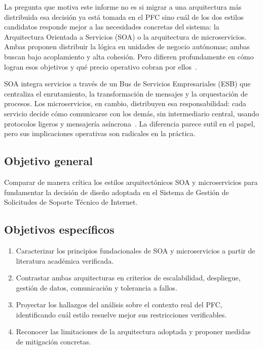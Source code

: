 \documentclass[12pt, a4paper]{article}
\begin{document}
La pregunta que motiva este informe no es si migrar a una arquitectura más
distribuida esa decisión ya está tomada en el PFC sino cuál de los dos
estilos candidatos responde mejor a las necesidades concretas del sistema: la
Arquitectura Orientada a Servicios (SOA) o la arquitectura de microservicios.
Ambas proponen distribuir la lógica en unidades de negocio autónomas; ambas buscan
bajo acoplamiento y alta cohesión. Pero difieren profundamente en cómo logran esos
objetivos y qué precio operativo cobran por ellos~\cite{shadija2017}.

SOA integra servicios a través de un Bus de Servicios Empresariales (ESB) que
centraliza el enrutamiento, la transformación de mensajes y la orquestación de
procesos. Los microservicios, en cambio, distribuyen esa responsabilidad: cada
servicio decide cómo comunicarse con los demás, sin intermediario central, usando
protocolos ligeros y mensajería asíncrona~\cite{liu2020}. La diferencia parece
sutil en el papel, pero sus implicaciones operativas son radicales en la práctica.

\subsection{Objetivo general}

Comparar de manera crítica los estilos arquitectónicos SOA y microservicios para
fundamentar la decisión de diseño adoptada en el Sistema de Gestión de Solicitudes
de Soporte Técnico de Internet.

\subsection{Objetivos específicos}

\begin{enumerate}
  \item Caracterizar los principios fundacionales de SOA y microservicios a partir
        de literatura académica verificada.
  \item Contrastar ambas arquitecturas en criterios de escalabilidad, despliegue,
        gestión de datos, comunicación y tolerancia a fallos.
        \newpage
  \item Proyectar los hallazgos del análisis sobre el contexto real del PFC,
        identificando cuál estilo resuelve mejor sus restricciones verificables.
  \item Reconocer las limitaciones de la arquitectura adoptada y proponer medidas
        de mitigación concretas.
\end{enumerate}
\end{document}

